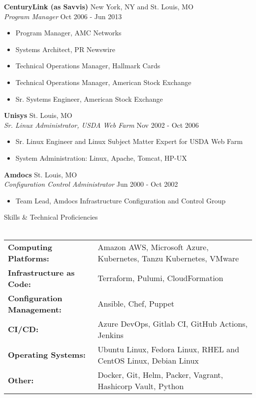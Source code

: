 \documentclass[letterpaper]{article}
\newcommand{\lineunder} {
    \vspace*{-8pt} \\
    \hspace*{-18pt} \hrulefill \\
}
\newcommand{\header} [1] {
    {\hspace*{-18pt}\vspace*{6pt} #1}
    \vspace*{-6pt} \lineunder
}
\begin{document}
\textbf{CenturyLink (as Savvis)} \hfill New York, NY and St. Louis, MO\\
\textit{Program Manager} \hfill Oct 2006 - Jun 2013\\
\vspace{-1mm}
\begin{itemize} \itemsep 1pt
	\item Program Manager, AMC Networks
	\item Systems Architect, PR Newswire
	\item Technical Operations Manager, Hallmark Cards
	\item Technical Operations Manager, American Stock Exchange
	\item Sr. Systems Engineer, American Stock Exchange
\end{itemize}
\textbf{Unisys} \hfill St. Louis, MO\\
\textit{Sr. Linux Administrator, USDA Web Farm} \hfill Nov 2002 - Oct 2006\\
\vspace{-1mm}
\begin{itemize} \itemsep 1pt
	\item Sr. Linux Engineer and Linux Subject Matter Expert for USDA Web Farm
	\item System Administration: Linux, Apache, Tomcat, HP-UX
\end{itemize}
\textbf{Amdocs} \hfill St. Louis, MO\\
\textit{Configuration Control Administrator} \hfill Jun 2000 - Oct 2002\\
\vspace{-1mm}
\begin{itemize} \itemsep 1pt
	\item Team Lead, Amdocs Infrastructure Configuration and Control Group
\end{itemize}

\header{Skills \& Technical Proficiencies}
\begin{tabular}{ l l }
  \textbf{Computing Platforms:}      & Amazon AWS, Microsoft Azure, Kubernetes, Tanzu Kubernetes, VMware\\
  \textbf{Infrastructure as Code:}   & Terraform, Pulumi, CloudFormation                                \\
  \textbf{Configuration Management:} & Ansible, Chef, Puppet                                            \\
  \textbf{CI/CD:}                    & Azure DevOps, Gitlab CI, GitHub Actions, Jenkins                 \\
  \textbf{Operating Systems:}        & Ubuntu Linux, Fedora Linux, RHEL and CentOS Linux, Debian Linux  \\
  \textbf{Other:}                    & Docker, Git, Helm, Packer, Vagrant, Hashicorp Vault, Python      \\
\end{tabular}
\vspace{2mm}
\end{document}
